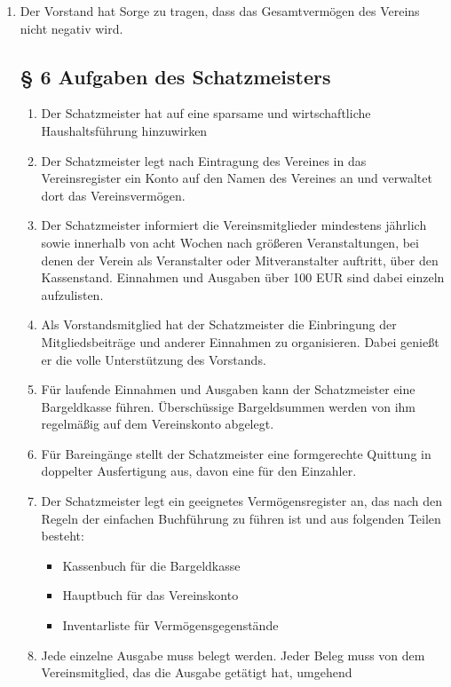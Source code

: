 \documentclass[10pt,a4paper]{article}
\begin{document}
\begin{enumerate}
\item Der Vorstand hat Sorge zu tragen, dass das Gesamtvermögen des Vereins nicht negativ wird.
%
%
\subsection*{§ 6 Aufgaben des Schatzmeisters}
\begin{enumerate}
\item Der Schatzmeister hat auf eine sparsame und wirtschaftliche
    Haushaltsführung hinzuwirken
\item Der Schatzmeister legt nach Eintragung des Vereines in das Vereinsregister
    ein Konto auf den Namen des Vereines an und verwaltet dort das
    Vereinsvermögen.
\item Der Schatzmeister informiert die Vereinsmitglieder mindestens
    jährlich sowie innerhalb von acht Wochen nach größeren
    Veranstaltungen, bei denen der Verein als Veranstalter oder
    Mitveranstalter auftritt, über den Kassenstand. Einnahmen und
    Ausgaben über 100 EUR sind dabei einzeln aufzulisten.
\item Als Vorstandsmitglied hat der Schatzmeister die Einbringung der
    Mitgliedsbeiträge und anderer Einnahmen zu organisieren. Dabei
    genießt er die volle Unterstützung des Vorstands.
\item Für laufende Einnahmen und Ausgaben kann der Schatzmeister eine
    Bargeldkasse führen. Über\-schüs\-sige Bargeldsummen werden von ihm
    regelmäßig auf dem Vereinskonto abgelegt.
\item Für Bareingänge stellt der Schatzmeister eine formgerechte Quittung
    in doppelter Ausfertigung aus, davon eine für den Einzahler.
\item Der Schatzmeister legt ein geeignetes Vermögensregister an, das
    nach den Regeln der einfachen Buchführung zu führen ist und aus
    folgenden Teilen besteht:
    \begin{itemize}
    \item Kassenbuch für die Bargeldkasse
    \item Hauptbuch für das Vereinskonto
    \item Inventarliste für Vermögensgegenstände 
    \end{itemize}
\item Jede einzelne Ausgabe muss belegt werden. Jeder Beleg muss von
    dem Vereinsmitglied, das die Ausgabe getätigt hat, umgehend

\end{enumerate}
\end{enumerate}
\end{document}
